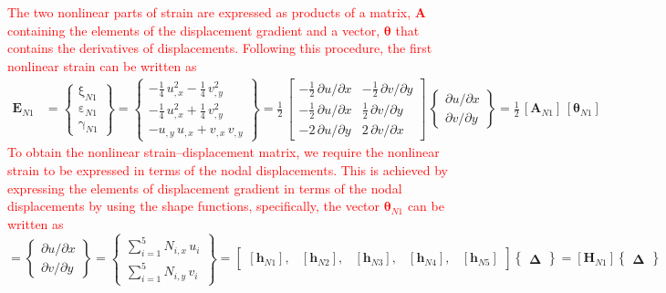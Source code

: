 \textcolor{red}{The two nonlinear parts of strain are expressed as products of a matrix, $\mathbf{A}$ containing the elements of the displacement gradient and a vector, $\boldsymbol{\theta}$ that contains the derivatives of displacements. Following this procedure, the first nonlinear strain can be written as}
\begin{equation}
\begin{aligned}
\mathbf{E}_{N1} & =  \begin{Bmatrix}
\mathrm \xi_{N1} \\
\mathrm \varepsilon_{N1} \\
\mathrm \gamma_{N1} \end{Bmatrix} =
\begin{Bmatrix}
-\tfrac{1}{4} \, u_{,x}^2 -   \tfrac{1}{4} \, v_{,y}^2 \\
-\tfrac{1}{4} \, u_{,x}^2 + \tfrac{1}{4} \, v_{,y}^2 \\
-u_{,y} \, u_{,x} + v_{,x} \, v_{,y} \end{Bmatrix} = \frac{1}{2} \, \begin{bmatrix}
-\tfrac{1}{2} \, \partial u / \partial x &  - \tfrac{1}{2} \, \partial v / \partial y \\
-\tfrac{1}{2} \, \partial u / \partial x &  \tfrac{1}{2} \, \partial v / \partial y \\
-2 \, \partial u / \partial y  & 2 \, \partial v / \partial x  \end{bmatrix} \, \begin{Bmatrix}
\partial u / \partial x\\
\partial v / \partial y
\end{Bmatrix}
= \tfrac{1}{2} \, [\mathbf{A}_{N1}] \, [\boldsymbol{\theta}_{N1}]
\end{aligned}
\end{equation}
\textcolor{red}{To obtain the nonlinear strain--displacement matrix, we require the nonlinear strain to be expressed in terms of the nodal displacements. This is achieved by expressing the elements of displacement gradient in terms of the nodal displacements by using the shape functions, specifically, the vector $\boldsymbol{\theta}_{N1}$ can be written as}
\begin{equation}
[\boldsymbol{\theta}_{N1}] =  \begin{Bmatrix}
\partial u / \partial x\\
\partial v / \partial y
\end{Bmatrix}
= \begin{Bmatrix}
\sum\nolimits_{i=1}^5 N_{i,x} \, u_i\\
\sum\nolimits_{i=1}^5 N_{i,y} \, v_i
\end{Bmatrix} 
= \begin{bmatrix}
[\mathbf{h}_{N1}], & [\mathbf{h}_{N2}], & [\mathbf{h}_{N3}], & [\mathbf{h}_{N4}], & [\mathbf{h}_{N5}] 
\end{bmatrix}  \begin{Bmatrix} \boldsymbol{\Delta} \end{Bmatrix}  
= [\mathbf{H}_{N1}] \begin{Bmatrix} \boldsymbol{\Delta} \end{Bmatrix} 
\end{equation}
